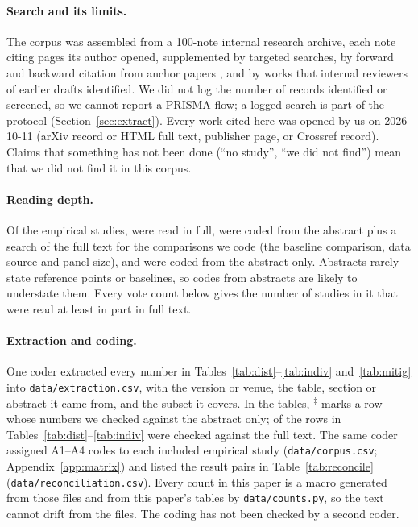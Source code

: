 \documentclass[11pt]{article}
\newcommand{\ab}{$^\ddagger$}
\begin{document}
\paragraph{Search and its limits.} The corpus was assembled from a 100-note internal research archive, each note citing pages its author opened, supplemented by targeted searches, by forward and backward citation from anchor papers \citep{argyle2023,bisbee2024,santurkar2023,park2024}, and by works that internal reviewers of earlier drafts identified. We did not log the number of records identified or screened, so we cannot report a PRISMA flow; a logged search is part of the protocol (Section~\ref{sec:extract}). Every work cited here was opened by us on 2026-10-11 (arXiv record or HTML full text, publisher page, or Crossref record). Claims that something has not been done (``no study'', ``we did not find'') mean that we did not find it in this corpus.

\paragraph{Reading depth.} Of the \cEmp{} empirical studies, \cEmpFull{} were read in full, \cEmpPartial{} were coded from the abstract plus a search of the full text for the comparisons we code (the baseline comparison, data source and panel size), and \cEmpAbstract{} were coded from the abstract only. Abstracts rarely state reference points or baselines, so codes from abstracts are likely to understate them. Every vote count below gives the number of studies in it that were read at least in part in full text.

\paragraph{Extraction and coding.} One coder extracted every number in Tables~\ref{tab:dist}--\ref{tab:indiv} and~\ref{tab:mitig} into \nolinkurl{data/extraction.csv}, with the version or venue, the table, section or abstract it came from, and the subset it covers. In the tables, \ab{} marks a row whose numbers we checked against the abstract only; \cRowsFull{} of the \cRows{} rows in Tables~\ref{tab:dist}--\ref{tab:indiv} were checked against the full text. The same coder assigned A1--A4 codes to each included empirical study (\nolinkurl{data/corpus.csv}; Appendix~\ref{app:matrix}) and listed the result pairs in Table~\ref{tab:reconcile} (\nolinkurl{data/reconciliation.csv}). Every count in this paper is a macro generated from those files and from this paper's tables by \nolinkurl{data/counts.py}, so the text cannot drift from the files. The coding has not been checked by a second coder.
\end{document}

